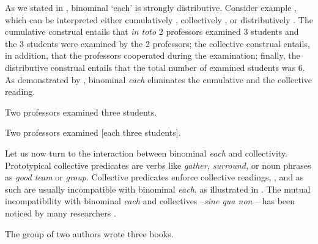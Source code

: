 \documentclass[output=paper,colorlinks,citecolor=brown,newtxmath]{langscibook}
\begin{document}
As we stated in , binominal `each' is strongly distributive. Consider example , which can be interpreted either cumulatively , collectively , or distributively . The cumulative construal entails that \textit{in toto} 2 professors examined 3 students and the 3 students were examined by the 2 professors; the collective construal entails, in addition, that the professors cooperated during the examination; finally, the distributive construal entails that the total number of examined students was 6.  As demonstrated by , binominal \textit{each} eliminates the cumulative and the collective reading.%

\ea\label{ex:line216} Two professors examined three students.
\z\z

\ea\label{ex:line220} Two professors examined {[}each three students{]}.
\z\z

\noindent Let us now turn to the interaction between binominal \textit{each} and collectivity. Prototypical collective predicates are verbs like \textit{gather, surround,} or noun phrases as \textit{good team} or \textit{group}. Collective predicates enforce collective readings, , and as such are usually incompatible with binominal \textit{each}, as illustrated in . The mutual incompatibility with binominal \textit{each} and collectives --\textit{sine qua non} -- has been noticed by many researchers \citep{Dowty1987,Brisson2003,Winter2002,Docekal2012}.


\ea\label{ex:line228} The group of two authors wrote three books.
\z\z
\end{document}
